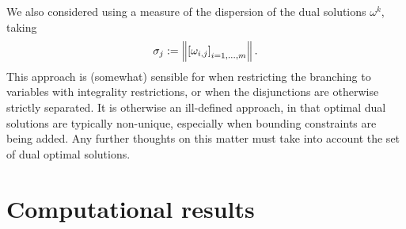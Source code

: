 \begin{remark}
We also considered using a measure of the dispersion of the dual solutions $\omega^k$, taking
$$
\sigma_j := \left \| \left[\omega_{i,j}\right]_{i=1,\dots,m} \right \|.
$$
This approach is (somewhat) sensible for when restricting the branching to variables with integrality restrictions, or when the disjunctions are otherwise strictly separated. It is otherwise an ill-defined approach, in that optimal dual solutions are typically non-unique, especially when bounding constraints are being added. Any further thoughts on this matter must take into account the set of dual optimal solutions.
\end{remark}

\section{Computational results}

